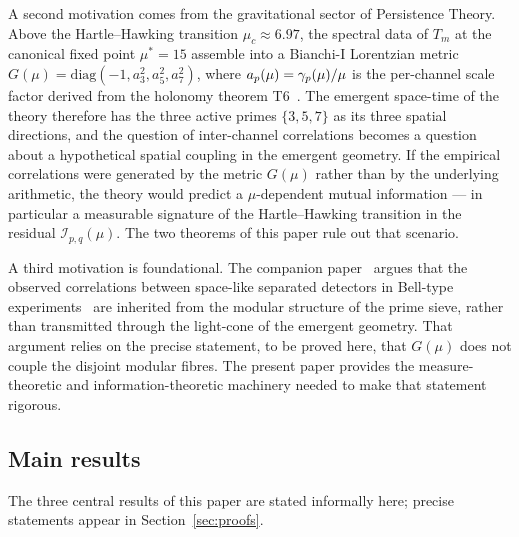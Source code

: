 A second motivation comes from the gravitational sector of Persistence
Theory. Above the Hartle--Hawking transition $\mu_c \approx 6.97$,
the spectral data of $T_m$ at the canonical fixed point
$\mu^\ast = 15$ assemble into a Bianchi-I Lorentzian metric
$G(\mu) = \mathrm{diag}(-1, a_3^2, a_5^2, a_7^2)$, where
$a_p(\mu) = \gamma_{p}(\mu) / \mu$ is the per-channel scale factor
derived from the holonomy theorem
T6~\cite[Ch.~6,~12]{PT_Monograph}. The emergent space-time of the
theory therefore has the three active primes $\{3, 5, 7\}$ as its
three spatial directions, and the question of inter-channel
correlations becomes a question about a hypothetical spatial coupling
in the emergent geometry. If the empirical correlations were
generated by the metric $G(\mu)$ rather than by the underlying
arithmetic, the theory would predict a $\mu$-dependent mutual
information --- in particular a measurable signature of the
Hartle--Hawking transition in the residual
$\mathcal{I}_{p,q}(\mu)$. The two theorems of this paper rule out
that scenario.

A third motivation is foundational. The companion
paper~\cite{PT_HOLONOMY_NONLOCALITY} argues that the observed
correlations between space-like separated detectors in Bell-type
experiments~\cite{Bell1964,AspectGrangier1982,Hensen2015} are
inherited from the modular structure of the prime sieve, rather than
transmitted through the light-cone of the emergent geometry. That
argument relies on the precise statement, to be proved here, that
$G(\mu)$ does not couple the disjoint modular fibres. The present
paper provides the measure-theoretic and information-theoretic
machinery needed to make that statement rigorous.

\subsection{Main results}
\label{ssec:main_results}

The three central results of this paper are stated informally
here; precise statements appear in
Section~\ref{sec:proofs}.

